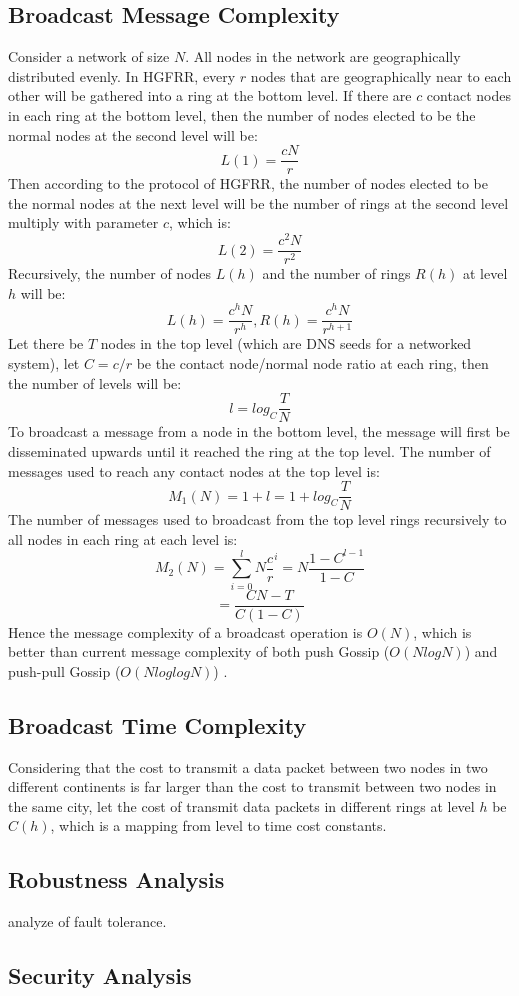 \subsection{Broadcast Message Complexity}

Consider a network of size $N$. All nodes in the network are geographically distributed evenly. 
In HGFRR, every $r$ nodes that are geographically near to each other will be gathered into a ring at the bottom level. 
If there are $c$ contact nodes in each ring at the bottom level, then the number of nodes elected to be the normal nodes at the second level will be: $$L(1) = \frac{cN}{r}$$ 
Then according to the protocol of HGFRR, the number of nodes elected to be the normal nodes at the next level will be the number of rings at the second level multiply with parameter $c$, which is: $$L(2) = \frac{c^2N}{r^2}$$ 
Recursively, the number of nodes $L(h)$ and the number of rings $R(h)$ at level $h$ will be: $$L(h) = \frac{c^hN}{r^h}, R(h)=\frac{c^hN}{r^{h+1}}$$ 
Let there be $T$ nodes in the top level (which are DNS seeds for a networked system), let $C = c/r$ be the contact node/normal node ratio at each ring, then the number of levels will be: $$l = log_{C}{\frac{T}{N}}$$
To broadcast a message from a node in the bottom level, the message will first be disseminated upwards until it reached the ring at the top level. The number of messages used to reach any contact nodes at the top level is: $$M_1(N)=1+l=1+log_{C}{\frac{T}{N}}$$
The number of messages used to broadcast from the top level rings recursively to all nodes in each ring at each level is: $$M_2(N)=\sum_{i=0}^{l} N\frac{c}{r}^i=N\frac{1-C^{l-1}}{1-C}$$
$$=\frac{CN-T}{C(1-C)}$$ Hence the message complexity of a broadcast operation is $O(N)$, which is better than current message complexity of both push Gossip ($O(NlogN)$) and push-pull Gossip ($O(NloglogN)$) \cite{jelasity2011gossip}.

\subsection{Broadcast Time Complexity}

Considering that the cost to transmit a data packet between two nodes in two different continents is far larger than the cost to transmit between two nodes in the same city, let the cost of transmit data packets in different rings at level $h$ be $C(h)$, which is a mapping from level to time cost constants.

\subsection{Robustness Analysis}

analyze of fault tolerance.

\subsection{Security Analysis}